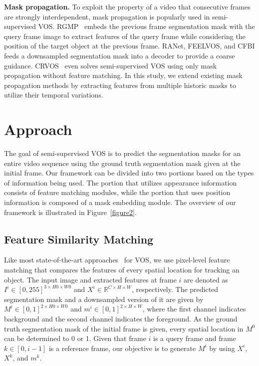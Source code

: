 \documentclass[10pt,twocolumn,letterpaper]{article}
\begin{document}
	
	\vspace{1mm}
	\noindent\textbf{Mask propagation.} To exploit the property of a video that consecutive frames are strongly interdependent, mask propagation is popularly used in semi-supervised VOS. RGMP~\cite{RGMP} embeds the previous frame segmentation mask with the query frame image to extract features of the query frame while considering the position of the target object at the previous frame. RANet, FEELVOS, and CFBI feeds a downsampled segmentation mask into a decoder to provide a coarse guidance. CRVOS~\cite{CRVOS} even solves semi-supervised VOS using only mask propagation without feature matching. In this study, we extend existing mask propagation methods by extracting features from multiple historic masks to utilize their temporal variations. 
	
	
	\section{Approach}
	The goal of semi-supervised VOS is to predict the segmentation masks for an entire video sequence using the ground truth segmentation mask given at the initial frame. Our framework can be divided into two portions based on the types of information being used. The portion that utilizes appearance information consists of feature matching modules, while the portion that uses position information is composed of a mask embedding module. The overview of our framework is illustrated in Figure~\ref{figure2}.
	
	
	\subsection{Feature Similarity Matching}
	\label{feature matching}
	Like most state-of-the-art approaches~\cite{RMNet, LCM, GIEL, SSTVOS} for VOS, we use pixel-level feature matching that compares the features of every spatial location for tracking an object. The input image and extracted features at frame $i$ are denoted as $I^i \in [0,255]^{3 \times H0 \times W0}$ and $X^i \in \mathbb{R}^{C \times H \times W}$, respectively. The predicted segmentation mask and a downsampled version of it are given by $M^i \in [0,1]^{2 \times H0 \times W0}$ and $m^i \in [0,1]^{2 \times H \times W}$, where the first channel indicates background and the second channel indicates the foreground. As the ground truth segmentation mask of the initial frame is given, every spatial location in $M^0$ can be determined to 0 or 1. Given that frame $i$ is a query frame and frame $k \in [0,i-1]$ is a reference frame, our objective is to generate $M^i$ by using $X^i$, $X^k$, and $m^k$.
	
\end{document}
